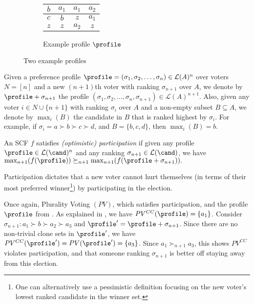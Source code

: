 \begin{figure}
\begin{subfigure}{.49\textwidth}
\begin{tabular}{|c|c|c|c|}
            \cellcolor{green!25} $b$ & \cellcolor{yellow!25} $a_1$ & \cellcolor{yellow!25} $a_1$ & \cellcolor{red!25} $a_2$ \\ \hline
            \cellcolor{blue!25} $c$ & \cellcolor{green!25} $b$ & \cellcolor{orange!25} $z$ & \cellcolor{yellow!25} $a_1$ \\ \hline
            \cellcolor{orange!25} $z$ & \cellcolor{orange!25} $z$& \cellcolor{red!25} $a_2$ & \cellcolor{orange!25} $z$ \\
            \hline
            \end{tabular}
        \caption{Example profile $\profile$}\label{fig:isda-counter}
    \end{subfigure}
\caption{Two example profiles}
\end{figure}
Given a preference profile $\profile=(\sigma_1,\sigma_2,\ldots, \sigma_n) \in \mathcal{L}(A)^n$ over voters $N=[n]$ and a new $(n+1)$th voter with ranking $\sigma_{n+1}$ over $A$, we denote by $\profile+\sigma_{n+1}$ the profile $(\sigma_1,\sigma_2,\ldots, \sigma_n, \sigma_{n+1}) \in \mathcal{L}(A)^{n+1}$. Also, given any voter $i \in N \cup \{n+1\}$ with ranking $\sigma_i$ over $A$ and a non-empty subset $B \subseteq A$, we denote by $\max_{i}(B)$ the candidate in $B$ that is ranked highest by $\sigma_i$. For example, if $\sigma_i = a \succ b \succ c \succ d$, and $B=\{b,c,d\}$, then $\max_i(B)=b$.


\begin{definition}\label{appdef:participation}
    An SCF $f$ satisfies \emph{(optimistic) participation} if given any profile $\profile \in \mathcal{L}(\cand)^n$ and any ranking $\sigma_{n+1} \in\mathcal{L}(\cand) $, we have $\max_{n+1}(f(\profile)) \succeq_{n+1} \max_{n+1}(f(\profile+\sigma_{n+1})).$

\end{definition}
 Participation dictates that a new voter cannot hurt themselves (in terms of their most preferred winner\footnote{One can alternatively use a pessimistic definition focusing on the new voter's lowest ranked candidate in the winner set.}) by participating in the election.

\begin{example}\label{ex:counter-part}
    Once again, Plurality Voting $(PV)$, which satisfies participation, and the profile $\profile$ from . As explained in , we have $PV^{CC}(\profile)=\{a_1\}$. Consider $\sigma_{n+1}: a_1 \succ b \succ a_2 \succ a_3$ and $\profile'=\profile+\sigma_{n+1}$. Since there are no non-trivial clone sets in $\profile'$, we have $PV^{CC}(\profile')=PV(\profile')= \{a_3\}$. Since $a_1 \succ_{n+1} a_3$, this shows $PV^{CC}$ violates participation, and that someone ranking $\sigma_{n+1}$ is better off staying away from this election. 
\end{example}
    
